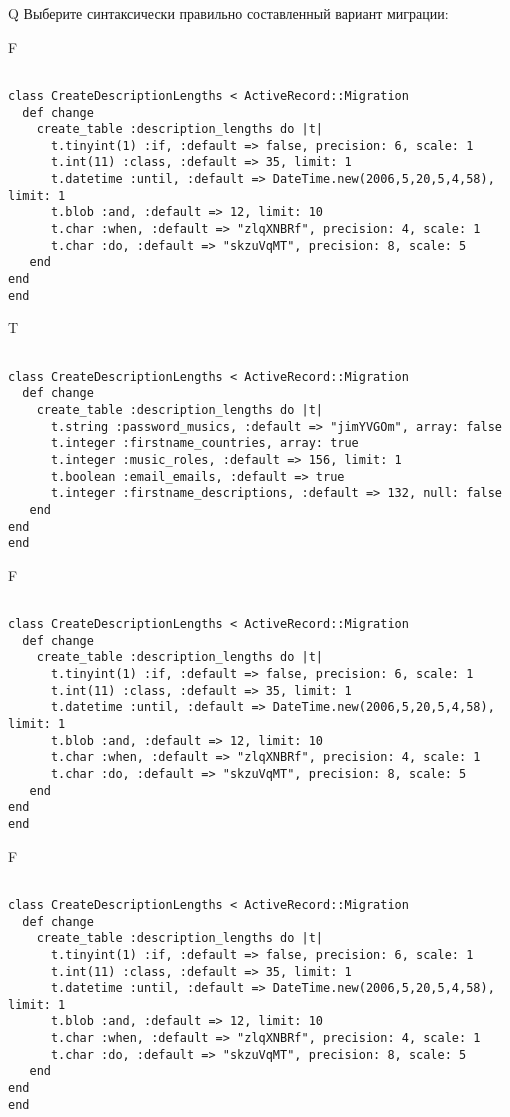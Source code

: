 Q
Выберите синтаксически правильно составленный вариант миграции:

F
\begin{verbatim}
		
class CreateDescriptionLengths < ActiveRecord::Migration 
  def change 
    create_table :description_lengths do |t| 
      t.tinyint(1) :if, :default => false, precision: 6, scale: 1
      t.int(11) :class, :default => 35, limit: 1
      t.datetime :until, :default => DateTime.new(2006,5,20,5,4,58), limit: 1
      t.blob :and, :default => 12, limit: 10
      t.char :when, :default => "zlqXNBRf", precision: 4, scale: 1
      t.char :do, :default => "skzuVqMT", precision: 8, scale: 5
   end
end
end
\end{verbatim}

T
\begin{verbatim}
		
class CreateDescriptionLengths < ActiveRecord::Migration 
  def change 
    create_table :description_lengths do |t| 
      t.string :password_musics, :default => "jimYVGOm", array: false
      t.integer :firstname_countries, array: true
      t.integer :music_roles, :default => 156, limit: 1
      t.boolean :email_emails, :default => true
      t.integer :firstname_descriptions, :default => 132, null: false
   end
end
end
\end{verbatim}

F
\begin{verbatim}
		
class CreateDescriptionLengths < ActiveRecord::Migration 
  def change 
    create_table :description_lengths do |t| 
      t.tinyint(1) :if, :default => false, precision: 6, scale: 1
      t.int(11) :class, :default => 35, limit: 1
      t.datetime :until, :default => DateTime.new(2006,5,20,5,4,58), limit: 1
      t.blob :and, :default => 12, limit: 10
      t.char :when, :default => "zlqXNBRf", precision: 4, scale: 1
      t.char :do, :default => "skzuVqMT", precision: 8, scale: 5
   end
end
end
\end{verbatim}

F
\begin{verbatim}
		
class CreateDescriptionLengths < ActiveRecord::Migration 
  def change 
    create_table :description_lengths do |t| 
      t.tinyint(1) :if, :default => false, precision: 6, scale: 1
      t.int(11) :class, :default => 35, limit: 1
      t.datetime :until, :default => DateTime.new(2006,5,20,5,4,58), limit: 1
      t.blob :and, :default => 12, limit: 10
      t.char :when, :default => "zlqXNBRf", precision: 4, scale: 1
      t.char :do, :default => "skzuVqMT", precision: 8, scale: 5
   end
end
end
\end{verbatim}

